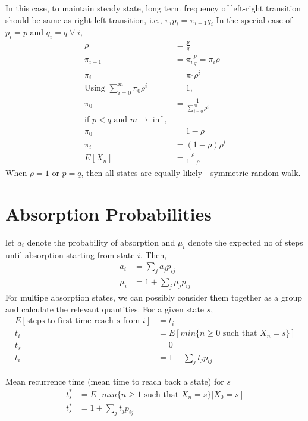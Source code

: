 \documentclass[../probability-notes.tex]{subfiles}
\begin{document}
    In this case, to maintain steady state, long term frequency of left-right transition should be same as right left transition, i.e., $\pi_{i}p_{i} = \pi_{i+1}q_{i}$ \newline
    In the special case of $p_{i} = p$ and $q_{i} = q \;\forall\; i$,
    \begin{align*}
        \rho &= \frac{p}{q} \tag*{load factor}\\
        \pi_{i+1} &= \pi_{i} \frac{p}{q} = \pi_{i} \rho \\
        \pi_{i} &= \pi_{0} \rho^{i} \tag*{$i = 0,\ldots,m$} \\
        \text{Using } \sum_{i=0}^{m} \pi_{0}\rho^{i} &= 1,\\
        \pi_{0} &= \frac{1}{\sum_{i=0}^{m} \rho^{i}}\\
        \text{if $p < q$ and $m \rightarrow \inf,$}\\
        \pi_{0} &= 1 - \rho \\
        \pi_{i} &= (1-\rho)\rho^{i}\\
        E[X_{n}] &= \frac{\rho}{1-\rho} \tag*{Exponential Distribution}
    \end{align*}
    When $\rho = 1$ or $p = q$, then all states are equally likely - symmetric random walk.

    \section{Absorption Probabilities}
    \label{sec_markov_absorb}
    let $a_{i}$ denote the probability of absorption and $\mu_{i}$ denote the expected no of steps until absorption starting from state $i$. Then,
    \begin{align*}
        a_{i} &= \sum_{j} a_{j}p_{ij} \tag*{outflux to the possible states}\\
        \mu_{i} &= 1 + \sum_{j} \mu_{j} p_{ij}
    \end{align*}
    For multipe absorption states, we can possibly consider them together as a group and calculate the relevant quantities. \newline
    For a given state $s$,
    \begin{align*}
        E[\text{steps to first time reach $s$ from $i$}] &= t_{i} \\
        t_{i} &= E[min \{n \geq 0 \text{ such that } X_{n} = s\}] \\
        t_{s} &= 0 \\
        t_{i} &= 1 + \sum_{j} t_{j}p_{ij} \tag*{outflux to all possible states}
    \end{align*}

    Mean recurrence time (mean time to reach back a state) for $s$
    \begin{align*}
        t_{s}^{*} &= E[min\{n \geq 1 \text{ such that } X_{n}=s\} | X_{0} = s] \\
        t_{s}^{*} &= 1 + \sum_{j} t_{j} p_{ij}
    \end{align*}
\end{document}
